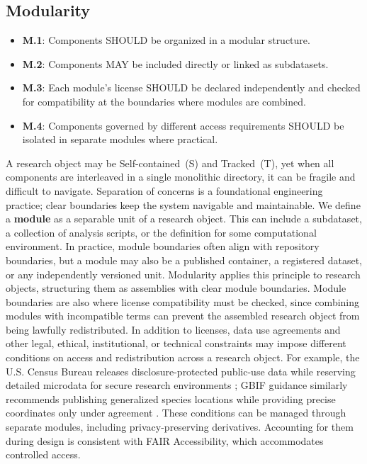 \documentclass{article}
\makeatletter
\newcommand{\hyanchor}[1]{\texorpdfstring{\Hy@raisedlink{\hypertarget{#1}{}}}{}}
\newcommand{\anchoredsubsection}[2]{\subsection[#2]{\hyanchor{#1}#2}}
\makeatother
\begin{document}
\anchoredsubsection{modularity}{Modularity}

\begin{itemize}
    \item \textbf{M.1}: Components SHOULD be organized in a modular structure.
    \item \textbf{M.2}: Components MAY be included directly or linked as subdatasets.
    \item \textbf{M.3}: Each module's license SHOULD be declared independently and checked for compatibility at the boundaries where modules are combined.
    \item \textbf{M.4}: Components governed by different access requirements SHOULD be isolated in separate modules where practical.
\end{itemize}

A research object may be Self-contained~(S) and Tracked~(T), yet when all components are interleaved in a single monolithic directory, it can be fragile and difficult to navigate.
Separation of concerns is a foundational engineering practice; clear boundaries keep the system navigable and maintainable.
We define a \textbf{module} as a separable unit of a research object.
This can include a subdataset, a collection of analysis scripts, or the definition for some computational environment.
In practice, module boundaries often align with repository boundaries, but a module may also be a published container, a registered dataset, or any independently versioned unit.
Modularity applies this principle to research objects, structuring them as assemblies with clear module boundaries.
Module boundaries are also where license compatibility must be checked, since combining modules with incompatible terms can prevent the assembled research object from being lawfully redistributed.
In addition to licenses, data use agreements and other legal, ethical, institutional, or technical constraints may impose different conditions on access and redistribution across a research object.
For example, the U.S. Census Bureau releases disclosure-protected public-use data while reserving detailed microdata for secure research environments \citep{united_states_census_bureau_dissemination_2025}; GBIF guidance similarly recommends publishing generalized species locations while providing precise coordinates only under agreement \citep{chapman_current_2020}.
These conditions can be managed through separate modules, including privacy-preserving derivatives.
Accounting for them during design is consistent with FAIR Accessibility, which accommodates controlled access.
\end{document}
